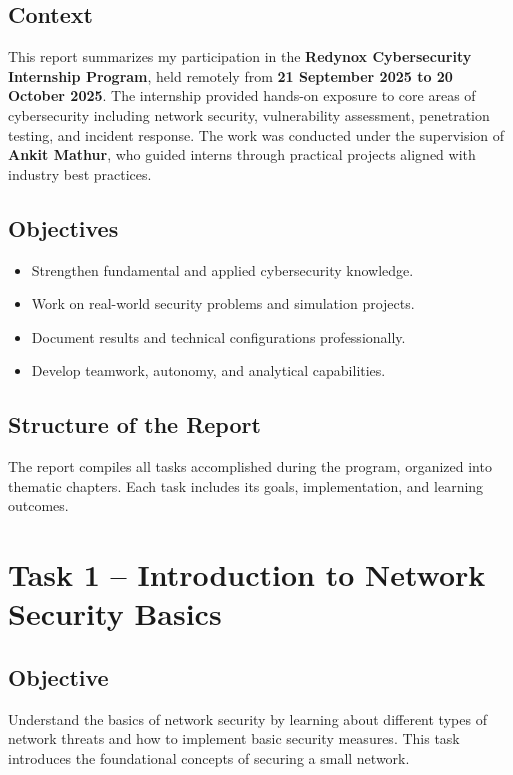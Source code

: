\documentclass[12pt,a4paper]{report}
\begin{document}
\section{Context}
This report summarizes my participation in the \textbf{Redynox Cybersecurity Internship Program},
held remotely from \textbf{21 September 2025 to 20 October 2025}.  
The internship provided hands-on exposure to core areas of cybersecurity including network security,
vulnerability assessment, penetration testing, and incident response.  
The work was conducted under the supervision of \textbf{Ankit Mathur}, who guided interns through
practical projects aligned with industry best practices.

\section{Objectives}
\begin{itemize}
  \item Strengthen fundamental and applied cybersecurity knowledge.
  \item Work on real-world security problems and simulation projects.
  \item Document results and technical configurations professionally.
  \item Develop teamwork, autonomy, and analytical capabilities.
\end{itemize}

\section{Structure of the Report}
The report compiles all tasks accomplished during the program, organized into thematic chapters.
Each task includes its goals, implementation, and learning outcomes.

\chapter{Task 1 – Introduction to Network Security Basics}

\section{Objective}
Understand the basics of network security by learning about different types of network threats
and how to implement basic security measures. This task introduces the foundational concepts
of securing a small network.
\end{document}
